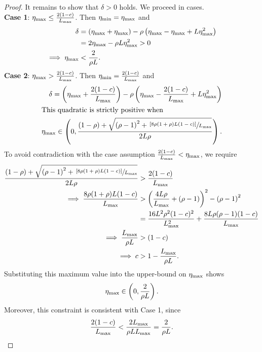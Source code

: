 \begin{proof}
    It remains to show that \( \delta > 0  \) holds. We proceed in cases.\\
    \textbf{Case 1}: \( \eta_{\text{max}} \leq \frac{2(1-c)}{L_{\text{max}}} \). Then \( \eta_{\text{min}} = \eta_{\text{max}} \) and 
    \begin{align*}
        \delta &= \left(\eta_{\text{max}} + \eta_{\text{max}}\right) - \rho \left(\eta_{\text{max}} - \eta_{\text{max}} + L \eta_{\text{max}}^2\right) \\
        &= 2 \eta_{\text{max}} - \rho L \eta_{\text{max}}^2 > 0 \\
        \implies \eta_{\text{max}} &< \frac{2}{\rho L}. 
    \end{align*}
    \textbf{Case 2}: \( \eta_{\text{max}} > \frac{2(1-c)}{L_{\text{max}}} \). Then \( \eta_{\text{min}} = \frac{2(1-c)}{L_{\text{max}}} \) and 
    \begin{align*}
        \delta =  \left(\eta_{\text{max}} + \frac{2(1-c)}{L_{\text{max}}}\right) - \rho \left(\eta_{\text{max}} - \frac{2(1-c)}{L_{\text{max}}} + L \eta_{\text{max}}^2\right) \\
        \intertext{This quadratic is strictly positive when}
        \eta_{\text{max}} \in \left(0, \frac{\left(1 - \rho\right) + \sqrt{{(\rho - 1)}^2 + \sfrac{\left[8 \rho (1 + \rho) L (1-c)\right]}{L_{\text{max}}}}}{2 L \rho}\right).
    \end{align*}
    To avoid contradiction with the case assumption \( \frac{2(1-c)}{L_{\text{max}}} < \eta_{\text{max}} \), we require
    \begin{align*}
        \frac{\left(1 - \rho\right) + \sqrt{{(\rho - 1)}^2 + \sfrac{\left[8 \rho (1 + \rho) L (1-c)\right]}{L_{\text{max}}}}}{2 L \rho} &> \frac{2(1-c)}{L_{\text{max}}}\\
        \implies \frac{8 \rho (1 + \rho) L (1-c)}{L_{\text{max}}} &> \left(\frac{4L \rho}{L_{\text{max}}} + (\rho - 1)\right)^2 - \left(\rho - 1\right)^2\\
                                                               &= \frac{16L^2 \rho^2 (1-c)^2}{L_{\text{max}}^2} + \frac{8 L \rho (\rho - 1) (1-c)}{L_{\text{max}}}\\ 
        \implies \frac{L_{\text{max}}}{\rho L} &> (1-c)\\
        \implies c &> 1 - \frac{L_{\text{max}}}{\rho L}.
    \end{align*}
    Substituting this maximum value into the upper-bound on \( \eta_{\text{max}} \) shows 
    \[ \eta_{\text{max}} \in \left(0, \frac{2}{\rho L}\right). \]
    Moreover, this constraint is consistent with Case 1, since 
    \[ \frac{2(1-c)}{L_{\text{max}}} < \frac{2 L_{\text{max}}}{\rho L L_{\text{max}}} = \frac{2}{\rho L}. \] 
\end{proof}


